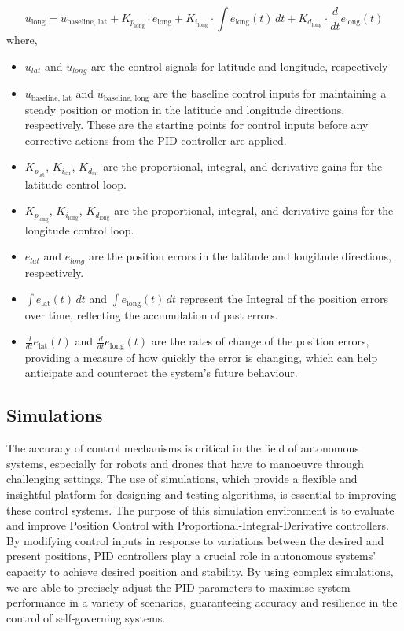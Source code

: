 \documentclass{report}
\begin{document}
\begin{equation}
  u_{\text{long}} = u_{\text{baseline, lat}} + K_{p_{\text{long}}} \cdot e_{\text{long}} + K_{i_{\text{long}}} \cdot \int e_{\text{long}}(t) \, dt + K_{d_{\text{long}}} \cdot \frac{d}{dt}e_{\text{long}}(t)
\end{equation}
where, 
\begin{itemize}
  \item \(u_{lat}\) and \(u_{long}\) are the control signals for latitude and
  longitude, respectively
  \item \(u_{\text{baseline, lat}}\) and \(u_{\text{baseline, long}}\) are the
  baseline control inputs for maintaining a steady position or motion in the
  latitude and longitude directions, respectively. These are the starting points
  for control inputs before any corrective actions from the PID controller are
  applied.
  \item \( K_{p_{\text{lat}}}\), \( K_{i_{\text{lat}}}\), \(
  K_{d_{\text{lat}}}\) are the proportional, integral, and derivative gains for
  the latitude control loop.
  \item \( K_{p_{\text{long}}}\), \( K_{i_{\text{long}}}\), \(
  K_{d_{\text{long}}}\) are the proportional, integral, and derivative gains for
  the longitude control loop.
  \item \(e_{lat}\) and \(e_{long}\) are the position errors in the latitude and
  longitude directions, respectively.
  \item \(\int e_{\text{lat}}(t) \, dt\) and \(\int e_{\text{long}}(t) \, dt\)
  represent the Integral of the position errors over time, reflecting the
  accumulation of past errors.
  \item \(\frac{d}{dt}e_{\text{lat}}(t)\) and \(\frac{d}{dt}e_{\text{long}}(t)\)
  are the rates of change of the position errors, providing a measure of how
  quickly the error is changing, which can help anticipate and counteract the
  system's future behaviour.
\end{itemize}

\subsection{Simulations}\label{PID_simulations} The accuracy of control
mechanisms is critical in the field of autonomous systems, especially for robots
and drones that have to manoeuvre through challenging settings. The use of
simulations, which provide a flexible and insightful platform for designing and
testing algorithms, is essential to improving these control systems. The purpose
of this simulation environment is to evaluate and improve Position Control with
Proportional-Integral-Derivative controllers. By modifying control inputs in
response to variations between the desired and present positions, PID
controllers play a crucial role in autonomous systems' capacity to achieve
desired position and stability. By using complex simulations, we are able to
precisely adjust the PID parameters to maximise system performance in a variety
of scenarios, guaranteeing accuracy and resilience in the control of
self-governing systems.
\end{document}
